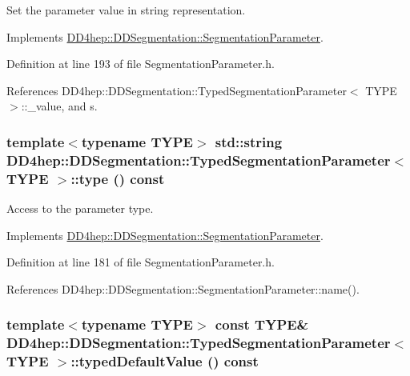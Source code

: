 Set the parameter value in string representation. 

Implements \hyperlink{class_d_d4hep_1_1_d_d_segmentation_1_1_segmentation_parameter_a91e9dae172660687daec4de4d730b192}{DD4hep::DDSegmentation::SegmentationParameter}.

Definition at line 193 of file SegmentationParameter.h.

References DD4hep::DDSegmentation::TypedSegmentationParameter$<$ TYPE $>$::\_\-value, and s.\hypertarget{class_d_d4hep_1_1_d_d_segmentation_1_1_typed_segmentation_parameter_a69e362f7662d675f97abf3c12233721d}{
\subsubsection[{type}]{\setlength{\rightskip}{0pt plus 5cm}template$<$typename TYPE$>$ std::string {\bf DD4hep::DDSegmentation::TypedSegmentationParameter}$<$ TYPE $>$::type () const}}
\label{class_d_d4hep_1_1_d_d_segmentation_1_1_typed_segmentation_parameter_a69e362f7662d675f97abf3c12233721d}


Access to the parameter type. 

Implements \hyperlink{class_d_d4hep_1_1_d_d_segmentation_1_1_segmentation_parameter_a761f142a3d6d7ecdbc200e97913af165}{DD4hep::DDSegmentation::SegmentationParameter}.

Definition at line 181 of file SegmentationParameter.h.

References DD4hep::DDSegmentation::SegmentationParameter::name().\hypertarget{class_d_d4hep_1_1_d_d_segmentation_1_1_typed_segmentation_parameter_aeb4b1afa4fd34ae8d3c7e5d1089e51c7}{
\subsubsection[{typedDefaultValue}]{\setlength{\rightskip}{0pt plus 5cm}template$<$typename TYPE$>$ const TYPE\& {\bf DD4hep::DDSegmentation::TypedSegmentationParameter}$<$ TYPE $>$::typedDefaultValue () const}}
\label{class_d_d4hep_1_1_d_d_segmentation_1_1_typed_segmentation_parameter_aeb4b1afa4fd34ae8d3c7e5d1089e51c7}


